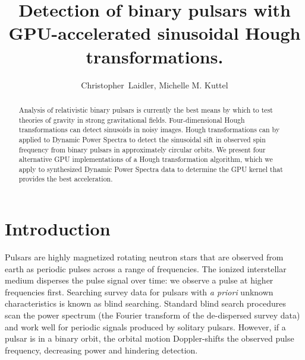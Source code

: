 \documentclass[11pt,twoside]{article}
\begin{document}
\title{Detection of  binary pulsars with GPU-accelerated sinusoidal Hough transformations.}
\author{Christopher~Laidler, Michelle M. Kuttel
}

\begin{abstract}
Analysis of relativistic binary pulsars is currently the best means by which to test theories of gravity in strong gravitational fields.
Four-dimensional Hough transformations can detect sinusoids in noisy images.
Hough transformations can by applied to Dynamic Power Spectra to detect the sinusoidal sift in observed spin frequency from binary pulsars in approximately circular orbits.
We present four  alternative GPU implementations of a Hough transformation algorithm, which we apply to synthesized  Dynamic Power Spectra data to determine  the GPU kernel that provides the best acceleration.
\end{abstract}

\section{Introduction}
Pulsars are highly magnetized rotating neutron stars that are observed from earth as periodic pulses across a range of frequencies.
The ionized interstellar medium disperses the pulse signal over time:  we observe a pulse at higher frequencies first.
Searching survey data for pulsars with \emph{a priori }unknown characteristics is known as blind searching.
Standard blind search procedures scan the power spectrum (the Fourier transform of the de-dispersed survey data) and work well for periodic signals produced by solitary pulsars.
However, if a pulsar is in a binary orbit, the orbital motion Doppler-shifts the observed pulse frequency, decreasing power and hindering detection.
\end{document}
